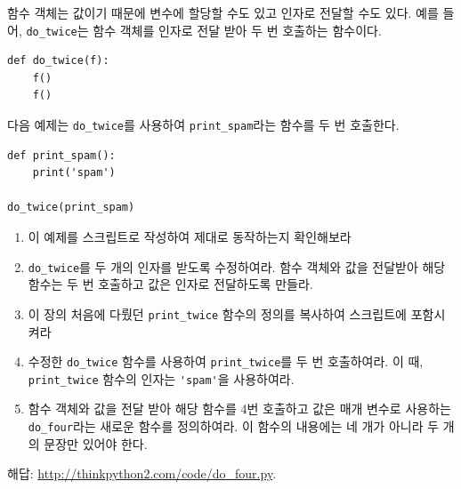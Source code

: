 \documentclass[10pt]{book}
\begin{document}
\begin{exercise}

함수 객체는 값이기 때문에 변수에 할당할 수도 있고 인자로 전달할 수도
있다.  예를 들어, \verb"do_twice"는 함수 객체를 인자로 전달 받아 두 번
호출하는 함수이다.

\begin{verbatim}
def do_twice(f):
    f()
    f()
\end{verbatim}

다음 예제는 \verb"do_twice"를 사용하여 \verb"print_spam"라는 함수를 두 번 호출한다.


\begin{verbatim}
def print_spam():
    print('spam')

do_twice(print_spam)
\end{verbatim}

\begin{enumerate}

\item 이 예제를 스크립트로 작성하여 제대로 동작하는지 확인해보라

\item \verb"do_twice"를 두 개의 인자를 받도록 수정하여라.  함수 객체와
  값을 전달받아 해당 함수는 두 번 호출하고 값은 인자로 전달하도록
  만들라.

\item 이 장의 처음에 다뤘던 \verb"print_twice" 함수의 정의를 복사하여
  스크립트에 포함시켜라

\item 수정한 \verb"do_twice" 함수를 사용하여 \verb"print_twice"를 두 번
  호출하여라.  이 때, \verb"print_twice" 함수의 인자는 \verb"'spam'"을
  사용하여라.

\item 함수 객체와 값을 전달 받아 해당 함수를 4번 호출하고 값은 매개 변수로 사용하는 \verb"do_four"라는 새로운 함수를 정의하여라.  이 함수의 내용에는 네 개가 아니라 두 개의 문장만 있어야 한다. 

\end{enumerate}

해답: \url{http://thinkpython2.com/code/do_four.py}.

\end{exercise}
\end{document}
